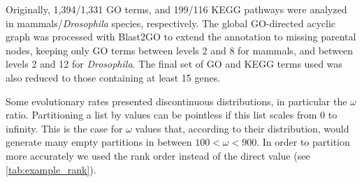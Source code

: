 Originally, 1,394/1,331 GO terms, and 199/116 KEGG pathways were analyzed in mammals/\textit{Drosophila} species, respectively. The global GO-directed acyclic graph was processed with Blast2GO \cite{Conesa2005} to extend the annotation to missing parental nodes, keeping only GO terms between levels 2 and 8 for mammals, and between levels 2 and 12 for \textit{Drosophila}. The final set of GO and KEGG terms used was also reduced to those containing at least 15 genes.


Some evolutionary rates presented discontinuous distributions, in particular the $\omega$ ratio. Partitioning a list by values can be pointless if this list scales from 0 to infinity. This is the case for $\omega$ values that, according to their distribution, would generate many empty partitions in between $100 < \omega < 900$. In order to partition more accurately we used the rank order instead of the direct value (see \autoref{tab:example_rank}).

